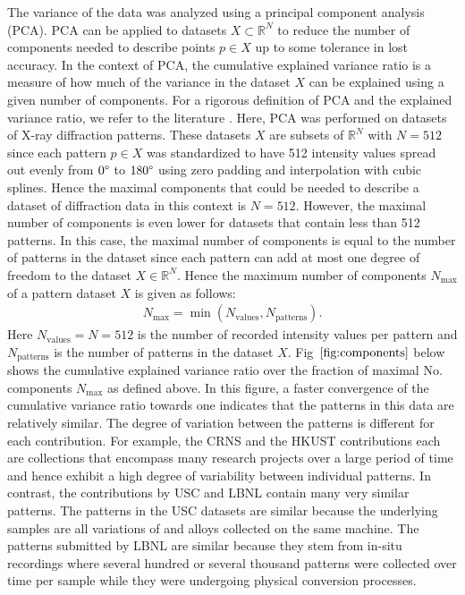 The variance of the data was analyzed using a principal component analysis (PCA). PCA can be applied to datasets $X \subset \mathbb{R}^N$ to reduce the number of components needed to describe points $p \in X$ up to some tolerance in lost accuracy. In the context of PCA, the cumulative explained variance ratio is a measure of how much of the variance in the dataset $X$ can be explained using a given number of components. For a rigorous definition of PCA and the explained variance ratio, we refer to the literature \cite{Jolliffe2016}. Here, PCA was performed on datasets of X-ray diffraction patterns. These datasets $X$ are subsets of $\mathbb{R}^{N}$ with $N=512$ since each pattern $p \in X$ was standardized to have 512 intensity values spread out evenly from $0\degree$ to $180\degree$ using zero padding and interpolation with cubic splines. Hence the maximal components that could be needed to describe a dataset of diffraction data in this context is $N=512$. However, the maximal number of components is even lower for datasets that contain less than 512 patterns. In this case, the maximal number of components is equal to the number of patterns in the dataset since each pattern can add at most one degree of freedom to the dataset $X \in \mathbb{R}^N$. Hence the maximum number of components $N_{\text{max}}$ of a pattern dataset $X$ is given as follows:
\begin{align}
    N_{\text{max}} = \min(N_{\text{values}}, N_{\text{patterns}}).
      \label{eq:nmax}
\end{align}
Here $N_{\text{values}} = N =512$ is the number of recorded intensity values per pattern and $N_{\text{patterns}}$ is the number of patterns in the dataset $X$. Fig~$\eqref{fig:components}$ below shows the cumulative explained variance ratio over the fraction of maximal No. components $N_{\text{max}}$ as defined above. In this figure, a faster convergence of the cumulative variance ratio towards one indicates that the patterns in this data are relatively similar. The degree of variation between the patterns is different for each contribution. For example, the CRNS and the HKUST contributions each are collections that encompass many research projects over a large period of time and hence exhibit a high degree of variability between individual patterns. In contrast, the contributions by USC and LBNL contain many very similar patterns. The patterns in the USC datasets are similar because the underlying samples are all variations of  and  alloys collected on the same machine. The patterns submitted by LBNL are similar because they stem from in-situ recordings where several hundred or several thousand patterns were collected over time per sample while they were undergoing physical conversion processes. \\

